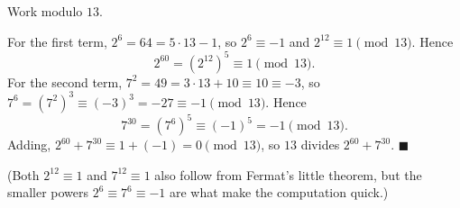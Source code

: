 Work modulo $13$.

For the first term, $2^{6}=64=5\cdot13-1$, so $2^6\equiv-1$ and $2^{12}\equiv1\pmod{13}$. Hence
\[
2^{60}=\left(2^{12}\right)^5\equiv1\pmod{13}.
\]
For the second term, $7^2=49=3\cdot13+10\equiv10\equiv-3$, so $7^6=\left(7^2\right)^3\equiv(-3)^3=-27\equiv-1\pmod{13}$. Hence
\[
7^{30}=\left(7^{6}\right)^5\equiv(-1)^5=-1\pmod{13}.
\]
Adding, $2^{60}+7^{30}\equiv1+(-1)=0\pmod{13}$, so $13$ divides $2^{60}+7^{30}$. $\blacksquare$

(Both $2^{12}\equiv1$ and $7^{12}\equiv1$ also follow from Fermat's little theorem, but the smaller powers $2^6\equiv7^6\equiv-1$ are what make the computation quick.)
